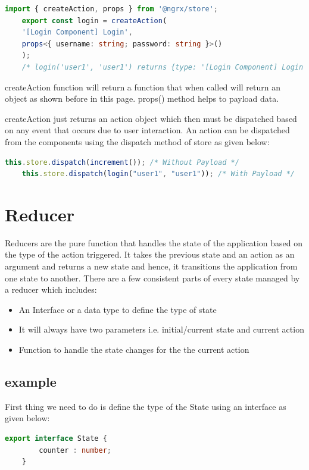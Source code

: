 \documentclass{report}
\begin{document}
\begin{lstlisting}[caption=with payload, language=Typescript]
	import { createAction, props } from '@ngrx/store';
	export const login = createAction(
	'[Login Component] Login',
	props<{ username: string; password: string }>()
	);
	/* login('user1', 'user1') returns {type: '[Login Component] Login', username:'user1', password:'user1' } */
\end{lstlisting}
createAction function will return a function that when called will return an object as shown before in this page. props() method helps to payload data. 

createAction just returns an action object which then must be dispatched based on any event that occurs due to user interaction. An action can be dispatched from the components using the dispatch method of store as given below:

\begin{lstlisting}[caption=example, language=Typescript]
	this.store.dispatch(increment()); /* Without Payload */
	this.store.dispatch(login("user1", "user1")); /* With Payload */
\end{lstlisting}

\section{Reducer}
Reducers are the pure function that handles the state of the application based on the type of the action triggered. It takes the previous state and an action as an argument and returns a new state and hence, it transitions the application from one state to another.
There are a few consistent parts of every state managed by a reducer which includes:
\begin{itemize}
	\item{An Interface or a data type to define the type of state}
	\item{It will always have two parameters i.e. initial/current state and current action}
	\item{Function to handle the state changes for the the current action}
\end{itemize}

\subsection{example}
First thing we need to do is define the type of the State using an interface as given below:
\begin{lstlisting}[caption=state.ts, language=Typescript]
	export interface State {
		counter : number;
	}
\end{lstlisting}
\end{document}
